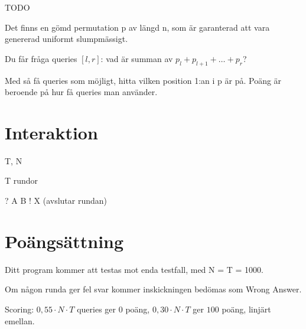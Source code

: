 
TODO

Det finns en gömd permutation p av längd n, som är garanterad att vara genererad uniformt slumpmässigt.

Du får fråga queries $[l,r]$: vad är summan av $p_l + p_{l+1} + \ldots + p_r$?

Med så få queries som möjligt, hitta vilken position 1:an i p är på. Poäng är beroende på hur få queries man använder.

\section*{Interaktion}

T, N

T rundor

? A B
! X (avslutar rundan)

\section*{Poängsättning}

Ditt program kommer att testas mot enda testfall, med N = T = 1000.

Om någon runda ger fel svar kommer inskickningen bedömas som Wrong Answer.

Scoring: $0,55 \cdot N \cdot T$ queries ger $0$ poäng, $0,30 \cdot N \cdot T$ ger $100$ poäng, linjärt emellan.
